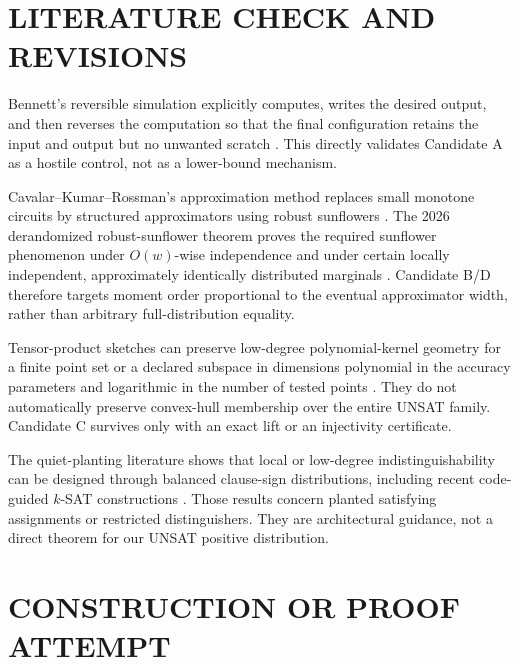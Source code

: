 \documentclass[11pt]{article}
\begin{document}
\section{LITERATURE CHECK AND REVISIONS}
Bennett's reversible simulation explicitly computes, writes the desired output, and then reverses the computation so that the final configuration retains the input and output but no unwanted scratch \cite{Bennett1973}. This directly validates Candidate A as a hostile control, not as a lower-bound mechanism.

Cavalar--Kumar--Rossman's approximation method replaces small monotone circuits by structured approximators using robust sunflowers \cite{CKR2022}. The 2026 derandomized robust-sunflower theorem proves the required sunflower phenomenon under $O(w)$-wise independence and under certain locally independent, approximately identically distributed marginals \cite{CFMSY2026}. Candidate B/D therefore targets moment order proportional to the eventual approximator width, rather than arbitrary full-distribution equality.

Tensor-product sketches can preserve low-degree polynomial-kernel geometry for a finite point set or a declared subspace in dimensions polynomial in the accuracy parameters and logarithmic in the number of tested points \cite{MSW2019,PhamPagh2025}. They do not automatically preserve convex-hull membership over the entire UNSAT family. Candidate C survives only with an exact lift or an injectivity certificate.

The quiet-planting literature shows that local or low-degree indistinguishability can be designed through balanced clause-sign distributions, including recent code-guided $k$-SAT constructions \cite{Quiet2012,Quiet2026}. Those results concern planted satisfying assignments or restricted distinguishers. They are architectural guidance, not a direct theorem for our UNSAT positive distribution.

\section{CONSTRUCTION OR PROOF ATTEMPT}
\end{document}
